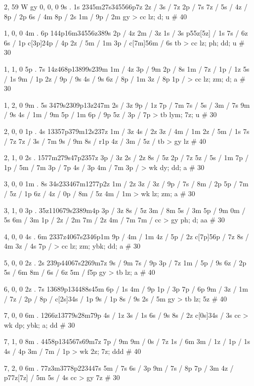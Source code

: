 2, 59
W
gy 
0, 0, 0
9s . 1s
2345m27s345566p7z
2z / 
3s / 7z 
2p / 7s 
7z / 
5s / 
4z / 
8p / 2p 
6s / 4m 
8p / 2s 
1m / 
9p / 2m
gy > cc
lz; d; u # 40

1, 0, 0
4m . 6p 
144p16m34556z389s
2p / 4z 
2m / 3z 
1s / 3s
p55z[5z] / 1s 
7s / 6z 
6s / 1p 
c[3p]24p / 4p
2z / 
5m / 1m 
3p / 
c[7m]56m / 6s 
tb > cc 
lz; ph; dd; u # 30

1, 1, 0
5p . 7s
14z468p13899s239m 
1m / 4z 
3p / 9m 
2p / 8s 
1m / 
7z / 
1p / 1z 
5s / 1s 
9m / 1p 
2z / 
9p / 9s 
4s / 9s 
6z / 
8p / 1m 
3z / 8p 
1p / 
> cc
lz; zm; d; a # 30

1, 2, 0
9m . 5s 
3479s2309p13z247m 
2s / 3z 
9p / 1z 
7p / 7m 
7s / 
5s / 
3m / 7s 
9m / 9s 
4s / 
1m / 9m 
5p / 1m 
6p / 9p 
5z / 
3p / 7p 
> tb 
lym; 7z; u # 30

2, 0, 0
1p . 4s
13357p379m12s237z 
1m / 3z 
4s / 2z 
3z / 
4m / 1m 
2z / 
5m / 1s 
7s / 7z 
7z / 
3s / 7m 
9s / 9m 
8s / r1p 
4z / 
3m / 
5z / 
tb > gy 
lz # 40

2, 1, 0
2s . 
1577m279s47p2357z 
3p / 3z 
2s / 2z 
8s / 5z 
2p / 7z 
5z / 
5s / 1m 
7p / 
1p / 
5m / 7m 
3p / 7p 
4s / 3p 
4m / 7m 
3p / 
> wk 
dy; dd; a # 30

3, 0, 0 
1m . 8s
34s233467m1277p2z
1m / 2z 
3z / 
3z / 
9p / 
7s / 
8m / 2p 
5p / 
7m / 
5z / 1p 
6z / 
4z / 
0p / 
8m / 5z 
4m / 1m 
> wk 
lz; zm; a # 30

3, 1, 0 
3p . 
35z110679s2389m4p 
3p / 3z 
8s / 5z 
3m / 8m 
5s / 3m 
5p / 9m 
0m / 5s 
6m / 3m 
1p / 
2z / 2m 
7m / 2z 
4m / 7m 
7m / 
cc > gy 
ph; d; aa # 30

4, 0, 0
4s . 6m 
2337z4067s2346p1m
9p / 
4m / 1m 
4z / 
5p / 2z 
c[7p]56p / 7z 
8s / 4m 
3z / 4s 
7p / 
> cc
lz; zm; ybk; dd; a # 30 

5, 0, 0 
2z . 2s
239p44067s2269m7z
9s / 9m 
7s / 9p 
3p / 7z 
1m / 
5p / 9s 
6z / 2p 
5s / 6m 
8m / 
6s / 6z 
5m / f5p 
gy > tb 
lz; a # 40 

6, 0, 0
2z . 7s
13689p134488s45m 
6p / 1s 
4m / 9p 
1p / 3p 
7p / 6p 
9m / 
3z / 
1m / 
7z / 
2p / 
8p / 
c[2s]34s / 1p 
9s / 1p 
8s / 9s 
2s / 5m 
gy > tb 
lz; 5z # 40 

7, 0, 0
6m . 
1266z13779s28m79p 
4s / 1z 
3s / 1s 
6s / 9s 
8s / 2z 
c[0s]34s / 3s 
cc > wk 
dp; ybk; a; dd # 30 

7, 1, 0 
8m . 
4458p134567s69m7z 
7p / 9m 
9m / 
0s / 7z 
1s / 6m 
3m / 
1z / 
1p / 1s 
4s / 4p 
3m / 
7m / 1p 
> wk 
2z; 7z; ddd # 40 

7, 2, 0
6m . 
77z3m3778p223447s 
5m / 7s 
6s / 3p 
9m / 
7s / 8p 
7p / 3m 
4z / 
p77z[7z] / 5m 
5s / 4s 
cc > gy 
7z # 30
